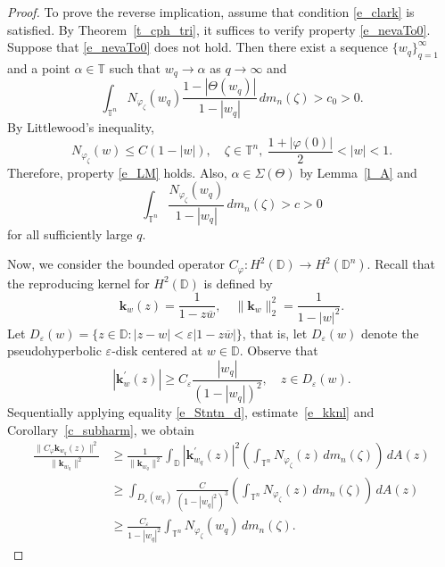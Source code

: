 \documentclass[10pt,a4paper]{amsart}
\newcommand{\Dbb}{\mathbb D}
\newcommand{\Tbb}{\mathbb T}
\newcommand{\al}{\alpha}
\newcommand{\aream}{A}
\newcommand{\cph}{C_\varphi}
\newcommand{\diin}{\Theta}
\newcommand{\dn}{\mathbb{D}^n}
\newcommand{\er}{\varepsilon}
\newcommand{\kknl}{\mathbf{k}}
\newcommand{\meal}{m_n}
\newcommand{\neva}{N}
\newcommand{\ph}{\varphi}
\newcommand{\spr}{\Sigma}
\newcommand{\tn}{\mathbb{T}^n}
\newcommand{\za}{\zeta}
\begin{document}
\begin{proof}
To prove the reverse implication, assume that condition \eqref{e_clark} is satisfied.
By Theo\-rem~\ref{t_cph_tri}, it suffices to verify property \eqref{e_nevaTo0}.
Suppose that \eqref{e_nevaTo0} does not hold.
Then there exist a sequence $\{w_q\}_{q=1}^\infty$ and a point $\al\in\Tbb$ such that
$w_q\to \al$ as $q\to \infty$ and
\[
\int_{\tn}\neva_{\ph_\za}(w_q) \frac{1-|\diin(w_q)|}{1-|w_q|}\, d\meal(\za) > c_0 > 0.
\]
By Littlewood's inequality,
\[
\neva_{\ph_\za}(w) \le C (1-|w|), \quad\za\in\tn,\ \frac{1+|\ph(0)|}{2} < |w| <1.
\]
Therefore, property \eqref{e_LM} holds. Also, $\al\in\spr(\diin)$ by Lemma~\ref{l_A} and
\begin{equation}\label{e_NgC}
\int_{\tn} \frac{\neva_{\ph_\za}(w_q)}{1-|w_q|}\, d\meal(\za) > c > 0
\end{equation}
for all sufficiently large $q$.


Now, we consider the bounded operator $\cph: H^2(\Dbb) \to H^2(\dn)$.
Recall that the reproducing kernel for $H^2(\Dbb)$ is defined by
\[
\kknl_w (z) = \frac{1}{1- z\overline{w}}, \quad \|\kknl_w\|_2^2 = \frac{1}{1-|w|^2}.
\]
Let $D_\er(w) = \{z\in\Dbb: |z-w| < \er|1- z\overline{w}|\}$, that is,
let $D_\er(w)$ denote the pseudohyperbolic $\er$-disk centered at  $w\in \Dbb$.
Observe that
\begin{equation}\label{e_kknl}
|\kknl_w^\prime (z)| \ge C_\er \frac{|w_q|}{(1-|w_q|)^2}, \quad z\in D_\er(w).
\end{equation}
Sequentially applying equality \eqref{e_Stntn_d}, estimate~\eqref{e_kknl} and Corollary~\ref{c_subharm}, we obtain
\begin{equation}\label{e_rker_estim}
\begin{aligned}
\frac{\|C_\ph \kknl_{w_q}(z)\|^2}{\|\kknl_{w_q}\|^2}
    &\ge \frac{1}{\|\kknl_{w_q}\|^2} \int_{\Dbb} |\kknl^\prime_{w_q}(z)|^2
\left(\int_{\tn} \neva_{\ph_\za}(z)\,  d\meal(\za) \right)\, d\aream(z)\\
    &\ge \int_{D_\er(w_q)} \frac{C}{(1- |w_q|^2)^{3}}
\left(\int_{\tn} \neva_{\ph_\za}(z)\,  d\meal(\za) \right)\, d\aream(z)\\
    &\ge \frac{C_\er}{1- |w_q|^2} \int_{\tn} \neva_{\ph_\za}(w_q)\,d\meal(\za).
\end{aligned}
\end{equation}



\end{proof}
\end{document}
